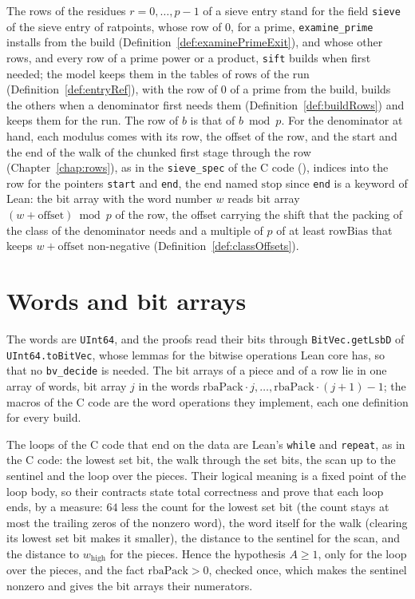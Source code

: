 \begin{definition}\label{def:rows}
  \leanok
  The rows of the residues $r = 0, \dots, p - 1$ of a sieve entry stand for the field \verb|sieve|
  of the sieve entry of ratpoints, whose row of $0$, for a prime, \verb|examine_prime| installs from
  the build (Definition~\ref{def:examinePrimeExit}), and whose other rows, and every row of a prime
  power or a product, \verb|sift| builds when first needed; the model keeps them in the tables of
  rows of the run (Definition~\ref{def:entryRef}), with the row of $0$ of a prime from the build,
  builds the others when a denominator first needs them (Definition~\ref{def:buildRows}) and keeps
  them for the run. The row of $b$ is that of $b \bmod p$. For the denominator at hand, each modulus
  comes with its row, the offset of the row, and the start and the end of the walk of the chunked
  first stage through the row (Chapter~\ref{chap:rows}), as in the \verb|sieve_spec| of the C code
  (), indices into the row for the pointers \verb|start| and
  \verb|end|, the end named $\mathrm{stop}$ since \verb|end| is a keyword of Lean: the bit array
  with the word number $w$ reads bit array $(w + \mathrm{offset}) \bmod p$ of the row, the offset
  carrying the shift that the packing of the class of the denominator needs and a multiple of $p$ of
  at least $\mathrm{rowBias}$ that keeps $w + \mathrm{offset}$ non-negative
  (Definition~\ref{def:classOffsets}).
\end{definition}

\section{Words and bit arrays}\label{sec:wordOps}

The words are \verb|UInt64|, and the proofs read their bits through \verb|BitVec.getLsbD| of
\verb|UInt64.toBitVec|, whose lemmas for the bitwise operations Lean core has, so that no
\verb|bv_decide| is needed. The bit arrays of a piece and of a row lie in one array of words, bit
array $j$ in the words $\mathrm{rbaPack} \cdot j, \dots, \mathrm{rbaPack} \cdot (j + 1) - 1$; the
macros of the C code are the word operations they implement, each one definition for every
build.

The loops of the C code that end on the data are Lean's \verb|while| and \verb|repeat|, as in the C
code: the lowest set bit, the walk through the set bits, the scan up to the sentinel and the loop
over the pieces. Their logical meaning is a fixed point of the loop body, so their contracts state
total correctness and prove that each loop ends, by a measure: $64$ less the count for the lowest
set bit (the count stays at most the trailing zeros of the nonzero word), the word itself for the
walk (clearing its lowest set bit makes it smaller), the distance to the sentinel for the scan, and
the distance to $w_{\mathrm{high}}$ for the pieces. Hence the hypothesis $A \ge 1$, only for the
loop over the pieces, and the fact $\mathrm{rbaPack} > 0$, checked once, which makes the sentinel
nonzero and gives the bit arrays their numerators.

